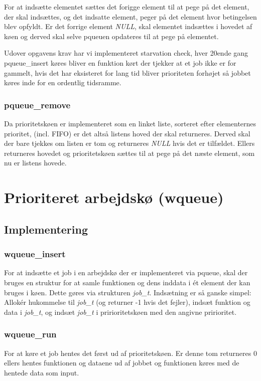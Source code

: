 \documentclass[titlepage]{article}
\begin{document}
      For at indsætte elementet sættes det forigge element til at pege på det element, der skal indsættes, og det indsatte element, peger på det element hvor betingelsen blev opfyldt.
      Er det forrige element {\it NULL}, skal elementet indsættes i hovedet af køen og derved skal selve pqueuen opdateres til at pege på elementet.

      Udover opgavens krav har vi implementeret starvation check, hver 20ende gang pqueue\_insert køres bliver en funktion kørt der tjekker at et job ikke er for gammelt, hvis det har eksisteret for lang tid bliver prioriteten forhøjet så jobbet køres inde for en ordentlig tidsramme.

    \subsubsection{pqueue\_remove}
      Da prioritetskøen er implementeret som en linket liste, sorteret efter elementernes prioritet, (incl. FIFO) er det altså listens hoved der skal returneres.
      Derved skal der bare tjekkes om listen er tom og returneres {\it NULL} hvis det er tilfældet.
      Ellers returneres hovedet og prioritetskøen sættes til at pege på det næste element, som nu er listens hovede.

\section{Prioriteret arbejdskø (wqueue)}
  \subsection{Implementering}
    \subsubsection{wqueue\_insert}
      For at indsætte et job i en arbejdskø der er implementeret via pqueue, skal der bruges en struktur for at samle funktionen og dens inddata i ét element der kan bruges i køen.
      Dette gøres via strukturen {\it job\_t}.
      Indsætning er så ganske simpel:
      Allokér hukommelse til {\it job\_t} (og returner -1 hvis det fejler), indsæt funktion og data i {\it job\_t}, og indsæt {\it job\_t} i pririoritetskøen med den angivne pririoritet.

    \subsubsection{wqueue\_run}
      For at køre et job hentes det først ud af prioritetskøen.
      Er denne tom returneres 0 ellers hentes funktionen og dataene ud af jobbet og funktionen køres med de hentede data som input.
\end{document}
